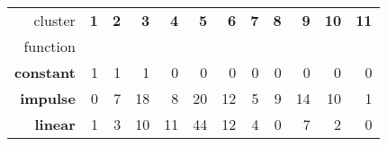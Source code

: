 \begin{tabular}{r|rrrrrrrrrrr}
cluster & \textbf{1} & \textbf{2} & \textbf{3} & \textbf{4} & \textbf{5} & \textbf{6} & \textbf{7} & \textbf{8} & \textbf{9} & \textbf{10} & \textbf{11} \\
function &  &  &  &  &  &  &  &  &  &  &  \\
\hline
\textbf{constant} & {\cellcolor[HTML]{023858}} \color[HTML]{F1F1F1} 1 & {\cellcolor[HTML]{023858}} \color[HTML]{F1F1F1} 1 & {\cellcolor[HTML]{023858}} \color[HTML]{F1F1F1} 1 & {\cellcolor[HTML]{FFF7FB}} \color[HTML]{000000} 0 & {\cellcolor[HTML]{FFF7FB}} \color[HTML]{000000} 0 & {\cellcolor[HTML]{FFF7FB}} \color[HTML]{000000} 0 & {\cellcolor[HTML]{FFF7FB}} \color[HTML]{000000} 0 & {\cellcolor[HTML]{FFF7FB}} \color[HTML]{000000} 0 & {\cellcolor[HTML]{FFF7FB}} \color[HTML]{000000} 0 & {\cellcolor[HTML]{FFF7FB}} \color[HTML]{000000} 0 & {\cellcolor[HTML]{FFF7FB}} \color[HTML]{000000} 0 \\
\textbf{impulse} & {\cellcolor[HTML]{FFF7FB}} \color[HTML]{000000} 0 & {\cellcolor[HTML]{AFC1DD}} \color[HTML]{000000} 7 & {\cellcolor[HTML]{045382}} \color[HTML]{F1F1F1} 18 & {\cellcolor[HTML]{9CB9D9}} \color[HTML]{000000} 8 & {\cellcolor[HTML]{023858}} \color[HTML]{F1F1F1} 20 & {\cellcolor[HTML]{4295C3}} \color[HTML]{F1F1F1} 12 & {\cellcolor[HTML]{D0D1E6}} \color[HTML]{000000} 5 & {\cellcolor[HTML]{88B1D4}} \color[HTML]{000000} 9 & {\cellcolor[HTML]{187CB6}} \color[HTML]{F1F1F1} 14 & {\cellcolor[HTML]{73A9CF}} \color[HTML]{F1F1F1} 10 & {\cellcolor[HTML]{F8F1F8}} \color[HTML]{000000} 1 \\
\textbf{linear} & {\cellcolor[HTML]{FCF4FA}} \color[HTML]{000000} 1 & {\cellcolor[HTML]{F5EEF6}} \color[HTML]{000000} 3 & {\cellcolor[HTML]{D5D5E8}} \color[HTML]{000000} 10 & {\cellcolor[HTML]{D0D1E6}} \color[HTML]{000000} 11 & {\cellcolor[HTML]{023858}} \color[HTML]{F1F1F1} 44 & {\cellcolor[HTML]{C9CEE4}} \color[HTML]{000000} 12 & {\cellcolor[HTML]{F1EBF5}} \color[HTML]{000000} 4 & {\cellcolor[HTML]{FFF7FB}} \color[HTML]{000000} 0 & {\cellcolor[HTML]{E5E1EF}} \color[HTML]{000000} 7 & {\cellcolor[HTML]{F8F1F8}} \color[HTML]{000000} 2 & {\cellcolor[HTML]{FFF7FB}} \color[HTML]{000000} 0 \\
\end{tabular}
